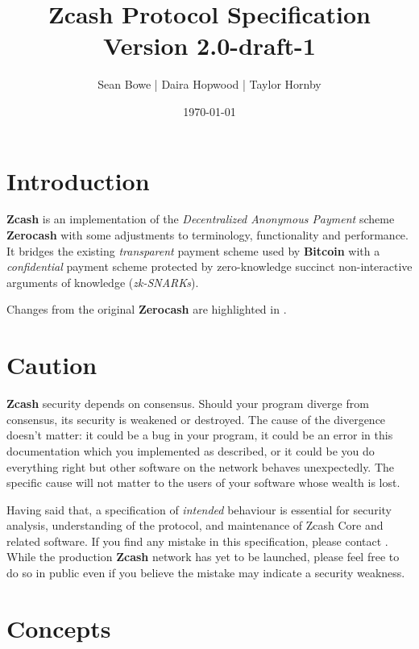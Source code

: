 \documentclass{article}
\newcommand{\todo}[1]{{\color{Sepia}\sf{TODO: #1}}}
\newcommand{\changedcolor}{magenta}
\newcommand{\setchanged}{\color{\changedcolor}}
\newcommand{\changed}[1]{{\setchanged{#1}}}
\newcommand{\term}[1]{\textsl{#1}\xspace}
\newcommand{\termbf}[1]{\textbf{#1}\xspace}
\newcommand{\Zcash}{\termbf{Zcash}}
\newcommand{\Zerocash}{\termbf{Zerocash}}
\newcommand{\Bitcoin}{\termbf{Bitcoin}}
\newcommand{\zkSNARKs}{\term{zk-SNARKs}}
\begin{document}
\title{Zcash Protocol Specification \\
\Large Version 2.0-draft-1}
\author{Sean Bowe | Daira Hopwood | Taylor Hornby}
\date{\today}
\maketitle

\tableofcontents
\newpage


\section{Introduction}

\Zcash is an implementation of the \term{Decentralized Anonymous Payment}
scheme \Zerocash \cite{ZerocashOakland} with some adjustments to terminology,
functionality and performance. It bridges the existing \emph{transparent}
payment scheme used by \Bitcoin with a \emph{confidential} payment scheme
protected by zero-knowledge succinct non-interactive arguments of knowledge
(\zkSNARKs).

Changes from the original \Zerocash are highlighted in \changed{\changedcolor}.

\section{Caution}

\Zcash security depends on consensus. Should your program diverge from
consensus, its security is weakened or destroyed. The cause of the divergence
doesn't matter: it could be a bug in your program, it could be an error in
this documentation which you implemented as described, or it could be you do
everything right but other software on the network behaves unexpectedly. The
specific cause will not matter to the users of your software whose wealth is
lost.

Having said that, a specification of \emph{intended} behaviour is essential
for security analysis, understanding of the protocol, and maintenance of
Zcash Core and related software. If you find any mistake in this specification,
please contact \todo{address}. While the production \Zcash network has yet
to be launched, please feel free to do so in public even if you believe the
mistake may indicate a security weakness.

\section{Concepts}
\end{document}

